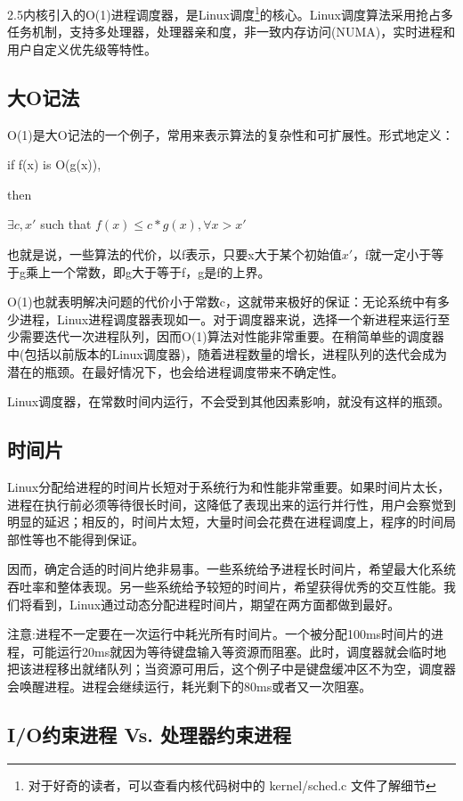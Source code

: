 2.5内核引入的O(1)进程调度器，是Linux调度\footnote[1]{对于好奇的读者，可以查看内核代码树中的 kernel/sched.c 文件了解细节}的核心。Linux调度算法采用抢占多任务机制，支持多处理器，处理器亲和度，非一致内存访问(NUMA)，实时进程和用户自定义优先级等特性。

\subsection{大O记法}
O(1)是大O记法的一个例子，常用来表示算法的复杂性和可扩展性。形式地定义：
\begin{center}
  if f(x) is O(g(x)),

  then

  $\exists c,x'$ such that $f(x) \le c * g(x), \forall x > x'$
\end{center}

也就是说，一些算法的代价，以f表示，只要x大于某个初始值$x'$，f就一定小于等于g乘上一个常数，即g大于等于f，g是f的上界。

O(1)也就表明解决问题的代价小于常数c，这就带来极好的保证：无论系统中有多少进程，Linux进程调度器表现如一。对于调度器来说，选择一个新进程来运行至少需要迭代一次进程队列，因而O(1)算法对性能非常重要。在稍简单些的调度器中(包括以前版本的Linux调度器)，随着进程数量的增长，进程队列的迭代会成为潜在的瓶颈。在最好情况下，也会给进程调度带来不确定性。

Linux调度器，在常数时间内运行，不会受到其他因素影响，就没有这样的瓶颈。

\subsection{时间片}

Linux分配给进程的时间片长短对于系统行为和性能非常重要。如果时间片太长，进程在执行前必须等待很长时间，这降低了表现出来的运行并行性，用户会察觉到明显的延迟；相反的，时间片太短，大量时间会花费在进程调度上，程序的时间局部性等也不能得到保证。

因而，确定合适的时间片绝非易事。一些系统给予进程长时间片，希望最大化系统吞吐率和整体表现。另一些系统给予较短的时间片，希望获得优秀的交互性能。我们将看到，Linux通过动态分配进程时间片，期望在两方面都做到最好。

注意:进程不一定要在一次运行中耗光所有时间片。一个被分配100ms时间片的进程，可能运行20ms就因为等待键盘输入等资源而阻塞。此时，调度器就会临时地把该进程移出就绪队列；当资源可用后，这个例子中是键盘缓冲区不为空，调度器会唤醒进程。进程会继续运行，耗光剩下的80ms或者又一次阻塞。

\subsection{I/O约束进程 Vs. 处理器约束进程}

